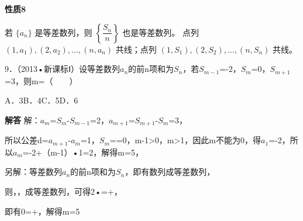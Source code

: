 \par\medskip\noindent\textbf{性质8}\par
\qquad{}若 $\{a_n\}$ 是等差数列，则 $\left\{\dfrac{S_n}{n}\right\}$ 也是等差数列。 点列 $(1,a_1),(2,a_2),\ldots,(n,a_n)$ 共线；点列 $(1,S_1),(2,S_2),\ldots,(n,S_n)$ 共线。\par
{}
9．（2013•新课标Ⅰ）设等差数列{\ensuremath{a_{n}}}的前n项和为\ensuremath{S_{n}}，若\ensuremath{S_{m-1}}=-2，\ensuremath{S_{m}}=0，\ensuremath{S_{m+1}}=3，则m=（　　）\par
\qquad{}\qquad{}\qquad{}A．3\qquad{}B．4\qquad{}C．5\qquad{}D．6\qquad{}\par
\QuestionSpace{1.2cm}
\ifshowanswers
\par\begingroup\color{solutioncolor}\noindent\textbf{解答}\quad
解：\ensuremath{a_{m}}=\ensuremath{S_{m}}-\ensuremath{S_{m-1}}=2，\ensuremath{a_{m+1}}=\ensuremath{S_{m+1}}-\ensuremath{S_{m}}=3，\par
所以公差d=\ensuremath{a_{m+1}}-\ensuremath{a_{m}}=1，\ensuremath{S_{m}}==0，m-1>0，m>1，因此m不能为0，得\ensuremath{a_{1}}=-2，所以\ensuremath{a_{m}}=-2+（m-1）•1=2，解得m=5，\par
另解：等差数列{\ensuremath{a_{n}}}的前n项和为\ensuremath{S_{n}}，即有数列{}成等差数列，\par
则，，成等差数列，可得2•=+，\par
即有0=+，解得m=5\par
\par\endgroup\fi

